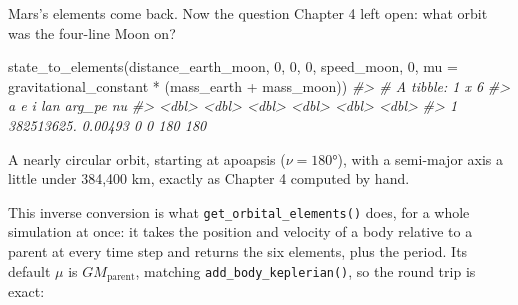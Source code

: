 \documentclass[
  10.5pt,
  letterpaper,
]{scrbook}
\newenvironment{Shaded}{\begin{snugshade}}{\end{snugshade}}
\newcommand{\AttributeTok}[1]{\textcolor[rgb]{0.00,0.00,0.00}{#1}}
\newcommand{\CommentTok}[1]{\textcolor[rgb]{0.00,0.00,0.00}{\textit{#1}}}
\newcommand{\DecValTok}[1]{\textcolor[rgb]{0.00,0.00,0.00}{#1}}
\newcommand{\FunctionTok}[1]{\textcolor[rgb]{0.00,0.00,0.00}{#1}}
\newcommand{\NormalTok}[1]{\textcolor[rgb]{0.00,0.00,0.00}{#1}}
\newcommand{\SpecialCharTok}[1]{\textcolor[rgb]{0.00,0.00,0.00}{#1}}
\theoremstyle{plain}
\theoremstyle{remark}
\begin{document}
Mars's elements come back. Now the question Chapter 4 left open: what
orbit was the four-line Moon on?

\begin{Shaded}
\begin{Highlighting}[]
\FunctionTok{state\_to\_elements}\NormalTok{(distance\_earth\_moon, }\DecValTok{0}\NormalTok{, }\DecValTok{0}\NormalTok{, }\DecValTok{0}\NormalTok{, speed\_moon, }\DecValTok{0}\NormalTok{,}
                  \AttributeTok{mu =}\NormalTok{ gravitational\_constant }\SpecialCharTok{*}\NormalTok{ (mass\_earth }\SpecialCharTok{+}\NormalTok{ mass\_moon))}
\CommentTok{\#\textgreater{} \# A tibble: 1 x 6}
\CommentTok{\#\textgreater{}            a       e     i   lan arg\_pe    nu}
\CommentTok{\#\textgreater{}        \textless{}dbl\textgreater{}   \textless{}dbl\textgreater{} \textless{}dbl\textgreater{} \textless{}dbl\textgreater{}  \textless{}dbl\textgreater{} \textless{}dbl\textgreater{}}
\CommentTok{\#\textgreater{} 1 382513625. 0.00493     0     0    180   180}
\end{Highlighting}
\end{Shaded}

A nearly circular orbit, starting at apoapsis (\(\nu = 180°\)), with a
semi-major axis a little under 384,400 km, exactly as Chapter 4 computed
by hand.

This inverse conversion is what \texttt{get\_orbital\_elements()} does,
for a whole simulation at once: it takes the position and velocity of a
body relative to a parent at every time step and returns the six
elements, plus the period. Its default \(\mu\) is
\(GM_{\mathrm{parent}}\), matching \texttt{add\_body\_keplerian()}, so
the round trip is exact:
\end{document}
